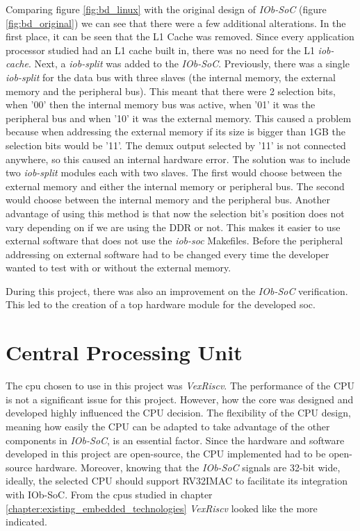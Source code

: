 Comparing figure \ref{fig:bd_linux} with the original design of \textit{IOb-SoC} (figure \ref{fig:bd_original}) we can see that there were a few additional alterations. In the first place, it can be seen that the L1 Cache was removed. Since every application processor studied had an L1 cache built in, there was no need for the L1 \textit{iob-cache}. Next, a \textit{iob-split} was added to the \textit{IOb-SoC}. Previously, there was a single \textit{iob-split} for the data bus with three slaves (the internal memory, the external memory and the peripheral bus). This meant that there were 2 selection bits, when '00' then the internal memory bus was active, when '01' it was the peripheral bus and when '10' it was the external memory. This caused a problem because when addressing the external memory if its size is bigger than 1GB the selection bits would be '11'. The \acrfull{demux} output selected by '11' is not connected anywhere, so this caused an internal hardware error. The solution was to include two \textit{iob-split} modules each with two slaves. The first would choose between the external memory and either the internal memory or peripheral bus. The second would choose between the internal memory and the peripheral bus. Another advantage of using this method is that now the selection bit's position does not vary depending on if we are using the DDR or not. This makes it easier to use external software that does not use the \textit{iob-soc} Makefiles. Before the peripheral addressing on external software had to be changed every time the developer wanted to test with or without the external memory.

During this project, there was also an improvement on the \textit{IOb-SoC} verification. This led to the creation of a top hardware module for the developed \acrlong{soc}.

\section{Central Processing Unit}
\label{section:cpu}
The \acrshort{cpu} chosen to use in this project was \textit{VexRiscv}. The performance of the CPU is not a significant issue for this project. However, how the core was designed and developed highly influenced the CPU decision. The flexibility of the CPU design, meaning how easily the CPU can be adapted to take advantage of the other components in \textit{IOb-SoC}, is an essential factor. Since the hardware and software developed in this project are open-source, the CPU implemented had to be open-source hardware. Moreover, knowing that the \textit{IOb-SoC} signals are 32-bit wide, ideally, the selected CPU should support RV32IMAC to facilitate its integration with IOb-SoC. From the \acrshort{cpu}s studied in chapter \ref{chapter:existing_embedded_technologies} \textit{VexRiscv} looked like the more indicated.

